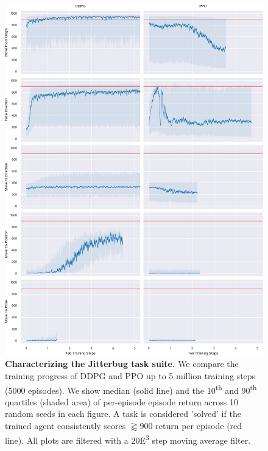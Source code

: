 \documentclass[letterpaper, 10 pt, conference]{ieeeconf}
\begin{document}
\begin{figure}[p]
    
    \centering
    \includegraphics[height=0.94\textheight]{fig-rl-perf}
    
    \caption{
        \textbf{Characterizing the Jitterbug task suite.}
        We compare the training progress of DDPG and PPO up to 5 million training steps (5000 episodes).
        We show median (solid line) and the 10\textsuperscript{th} and 90\textsuperscript{th} quartiles (shaded area) of per-episode episode return across 10 random seeds in each figure.
        A task is considered 'solved' if the trained agent consistently scores $\gtrapprox 900$ return per episode (red line).
        All plots are filtered with a 20{\tiny E}\textsuperscript{3} step moving average filter.
    }
    
    \label{fig:rl-perf}
\end{figure}
\end{document}

